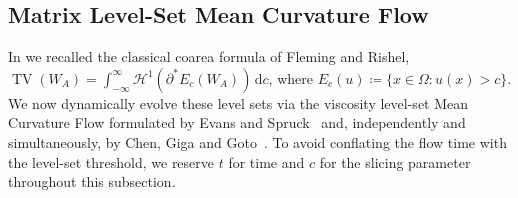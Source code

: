 \documentclass[11pt,a4paper,reqno]{amsart}
\theoremstyle{definition}
\numberwithin{equation}{section}
\providecommand{\TV}{\operatorname{TV}}
\newcommand{\dif}{\,\mathrm{d}}
\providecommand{\TV}{\mathrm{TV}}
\begin{document}
\subsection{Matrix Level-Set Mean Curvature Flow}
In \cite{silvafilho2026functional} we recalled the classical coarea formula of Fleming and Rishel, $\TV(W_A) = \int_{-\infty}^\infty \mathcal{H}^1(\partial^* E_c(W_A)) \dif c$, where $E_c(u) \coloneqq \{x \in \Omega \colon u(x) > c\}$. We now dynamically evolve these level sets via the viscosity level-set Mean Curvature Flow formulated by Evans and Spruck~\cite{evans1991mcf} and, independently and simultaneously, by Chen, Giga and Goto~\cite{chen1991uniqueness}. To avoid conflating the flow time with the level-set threshold, we reserve $t$ for time and $c$ for the slicing parameter throughout this subsection.
\end{document}
